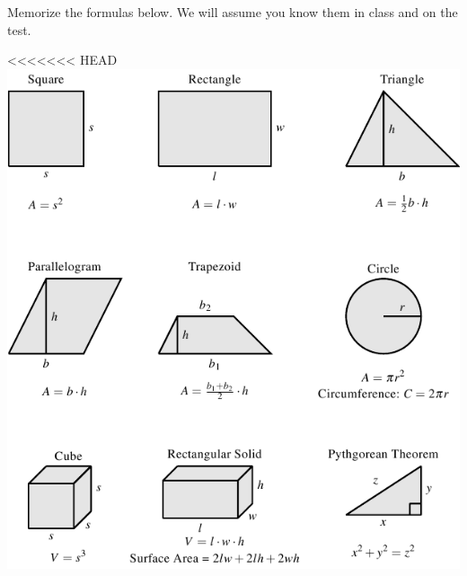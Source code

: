 \documentclass{ximera}
\begin{document}
Memorize the formulas below. We will assume you know them in class and on the test.
\begin{image}
<<<<<<< HEAD
\includegraphics{Optimization3.png}
%
%
%

\end{image}
\end{document}
